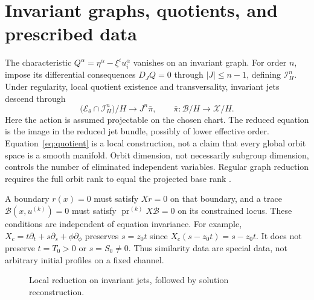 \documentclass[11pt,a4paper,oneside]{report}
\numberwithin{equation}{chapter}
\newcommand{\E}{\mathcal E}
\newcommand{\pr}{\operatorname{pr}}
\begin{document}
\section{Invariant graphs, quotients, and prescribed data}
The characteristic $Q^\alpha=\eta^\alpha-\xi^iu_i^\alpha$ vanishes on an invariant graph. For order $n$, impose its differential consequences $D_JQ=0$ through $|J|\le n-1$, defining $\mathcal I_H^n$. Under regularity, local quotient existence and transversality, invariant jets descend through
\begin{equation}\label{eq:quotient}
\bigl(\E_\theta\cap\mathcal I_H^n\bigr)/H
\longrightarrow J^n\bar\pi,\qquad
\bar\pi:\mathcal B/H\longrightarrow\mathcal X/H.
\end{equation}
Here the action is assumed projectable on the chosen chart. The reduced equation is the image in the reduced jet bundle, possibly of lower effective order. Equation~\eqref{eq:quotient} is a local construction, not a claim that every global orbit space is a smooth manifold. Orbit dimension, not necessarily subgroup dimension, controls the number of eliminated independent variables. Regular graph reduction requires the full orbit rank to equal the projected base rank \cite{olver1986,anderson2000}.



A boundary $r(x)=0$ must satisfy $Xr=0$ on that boundary, and a trace $\mathcal B(x,u^{(k)})=0$ must satisfy $\pr^{(k)}X\mathcal B=0$ on its constrained locus. These conditions are independent of equation invariance. For example, $X_c=t\partial_t+s\partial_s+\phi\partial_\phi$ preserves $s=z_0t$ since $X_c(s-z_0t)=s-z_0t$. It does not preserve $t=T_0>0$ or $s=S_0\ne0$. Thus similarity data are special data, not arbitrary initial profiles on a fixed channel.
\begin{figure}[htbp]\centering
{}
\caption{Local reduction on invariant jets, followed by solution reconstruction.}\label{fig:quotient}
\end{figure}
\end{document}
